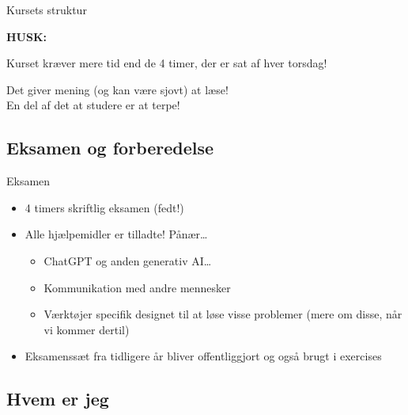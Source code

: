 \documentclass{beamer}
\begin{document}
\begin{frame}{Kursets struktur}

    \textbf{HUSK:}

    \medskip
    Kurset \alert{kræver mere tid end de 4 timer}, der er sat af hver
    torsdag!

    \medskip
    Det giver \alert{mening} (og kan være \alert{sjovt}) at \alert{læse}! \\

    \medskip
    En del af det at studere er at \alert{terpe}!
    
\end{frame}

\subsection[Eksamen]{Eksamen og forberedelse}

\begin{frame}{Eksamen}

    \begin{itemize}
        \item 4 timers skriftlig eksamen (fedt!)
            \pause
        \item Alle hjælpemidler er tilladte! \pause \alert{Pånær\ldots}
            \begin{itemize}
                \item ChatGPT og anden generativ AI\ldots
                \item Kommunikation med andre mennesker
                \item Værktøjer specifik designet til at løse visse problemer
                    (mere om disse, når vi kommer dertil)
            \end{itemize}
            \pause
        \item Eksamenssæt fra tidligere år bliver offentliggjort og også brugt i
            exercises
    \end{itemize}
    
\end{frame}

\subsection[Mig]{Hvem er jeg}
\end{document}
